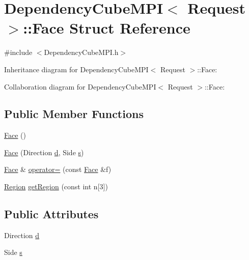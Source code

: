 \hypertarget{struct_dependency_cube_m_p_i_1_1_face}{}\section{Dependency\+Cube\+M\+P\+I$<$ Request $>$\+:\+:Face Struct Reference}
\label{struct_dependency_cube_m_p_i_1_1_face}


{\ttfamily \#include $<$Dependency\+Cube\+M\+P\+I.\+h$>$}



Inheritance diagram for Dependency\+Cube\+M\+P\+I$<$ Request $>$\+:\+:Face\+:


Collaboration diagram for Dependency\+Cube\+M\+P\+I$<$ Request $>$\+:\+:Face\+:
\subsection*{Public Member Functions}
\begin{DoxyCompactItemize}
\item 
\hyperlink{struct_dependency_cube_m_p_i_1_1_face_a6fdbbfc5d6d27acbc0765c03aed7606a}{Face} ()
\item 
\hyperlink{struct_dependency_cube_m_p_i_1_1_face_a23f82a7099e13def1a59b4d40c1da674}{Face} (Direction \hyperlink{struct_dependency_cube_m_p_i_1_1_face_a8ca1f274c00b7e97ab3c327d3236494f}{d}, Side \hyperlink{struct_dependency_cube_m_p_i_1_1_face_a0f93c85a3376303880fc199236b0e3da}{s})
\item 
\hyperlink{struct_dependency_cube_m_p_i_1_1_face}{Face} \& \hyperlink{struct_dependency_cube_m_p_i_1_1_face_abdc8f00313364053f6756d6df3d24d80}{operator=} (const \hyperlink{struct_dependency_cube_m_p_i_1_1_face}{Face} \&f)
\item 
\hyperlink{struct_region}{Region} \hyperlink{struct_dependency_cube_m_p_i_1_1_face_aac6960e98b8018d962de087d4052fa6f}{get\+Region} (const int n\mbox{[}3\mbox{]})
\end{DoxyCompactItemize}
\subsection*{Public Attributes}
\begin{DoxyCompactItemize}
\item 
Direction \hyperlink{struct_dependency_cube_m_p_i_1_1_face_a8ca1f274c00b7e97ab3c327d3236494f}{d}
\item 
Side \hyperlink{struct_dependency_cube_m_p_i_1_1_face_a0f93c85a3376303880fc199236b0e3da}{s}
\end{DoxyCompactItemize}


